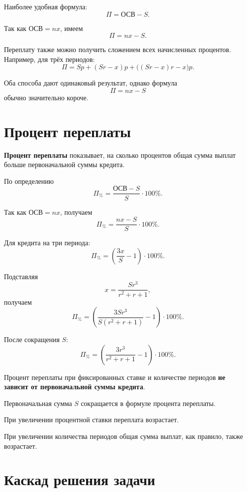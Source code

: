 \documentclass[a4paper,12pt]{article}
\newcommand{\term}[1]{\textbf{\color{darkaccent}#1}}
\newcommand{\important}[1]{\textbf{#1}}
\begin{document}
Наиболее удобная формула:
\[
\boxed{\Pi=\text{ОСВ}-S}.
\]

Так как \(\text{ОСВ}=nx\), имеем
\[
\boxed{\Pi=nx-S}.
\]

Переплату также можно получить сложением всех начисленных процентов. Например,
для трёх периодов:
\[
\Pi
=
Sp
+
(Sr-x)p
+
\bigl((Sr-x)r-x\bigr)p.
\]

Оба способа дают одинаковый результат, однако формула
\[
\Pi=nx-S
\]
обычно значительно короче.

\section{Процент переплаты}

\term{Процент переплаты} показывает, на сколько процентов общая сумма выплат
больше первоначальной суммы кредита.

По определению
\[
\boxed{
\Pi_{\%}
=
\frac{\text{ОСВ}-S}{S}\cdot 100\%
}.
\]

Так как \(\text{ОСВ}=nx\), получаем
\[
\boxed{
\Pi_{\%}
=
\frac{nx-S}{S}\cdot 100\%
}.
\]

Для кредита на три периода:
\[
\Pi_{\%}
=
\left(
\frac{3x}{S}-1
\right)\cdot 100\%.
\]

Подставляя
\[
x=\frac{Sr^3}{r^2+r+1},
\]
получаем
\[
\Pi_{\%}
=
\left(
\frac{3Sr^3}{S(r^2+r+1)}-1
\right)\cdot 100\%.
\]

После сокращения \(S\):
\[
\boxed{
\Pi_{\%}
=
\left(
\frac{3r^3}{r^2+r+1}-1
\right)\cdot 100\%
}.
\]

\begin{checklist}
  \item Процент переплаты при фиксированных ставке и количестве периодов
  \important{не зависит от первоначальной суммы кредита}.

  \item Первоначальная сумма \(S\) сокращается в формуле процента переплаты.

  \item При увеличении процентной ставки переплата возрастает.

  \item При увеличении количества периодов общая сумма выплат, как правило,
  также возрастает.
\end{checklist}

\section{Каскад решения задачи}
\end{document}
